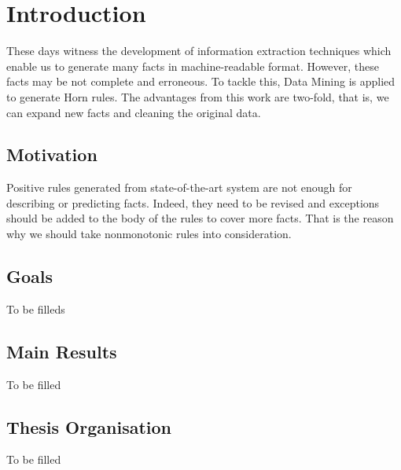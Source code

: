 \chapter{Introduction}
\label{chap:intro}

These days witness the development of information extraction techniques which enable us to generate many facts in machine-readable format. However, these facts may be not complete and erroneous. To tackle this, Data Mining is applied to generate Horn rules. The advantages from this work are two-fold, that is, we can expand new facts and cleaning the original data.

\section{Motivation}

Positive rules generated from state-of-the-art system are not enough for describing or predicting facts. Indeed, they need to be revised and exceptions should be added to the body of the rules to cover more facts. That is the reason why we should take nonmonotonic rules into consideration.


\section{Goals}

To be filleds

\section{Main Results}

To be filled

\section{Thesis Organisation}

To be filled

